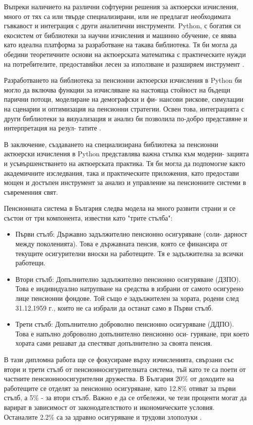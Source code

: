 \documentclass[a4paper,12pt]{article}
\begin{document}
Въпреки наличието на различни софтуерни решения за актюерски изчисления, много от тях са или твърде специализирани, или не предлагат необходимата гъвкавост и интеграция с други аналитични инструменти. Python, с богатия си екосистем от библиотеки за научни изчисления и машинно обучение, се явява като идеална платформа за разработване на такава библиотека. Тя би могла да обедини теоретичните основи на актюерската математика с практическите нужди на потребителите, предоставяйки лесен за използване и разширяем инструмент \cite{numpy2024, pandas2024}.

Разработването на библиотека за пенсионни актюерски изчисления в Python би могло да включва функции за изчисляване на настояща стойност на бъдещи парични потоци, моделиране на демографски и фи- нансови рискове, симулации на сценарии и оптимизация на пенсионни стратегии. Освен това, интеграцията с други библиотеки за визуализация и анализ би позволила по-добро представяне и интерпретация на резул- татите \cite{matplotlib2024, seaborn2024}.

В заключение, създаването на специализирана библиотека за пенсионни актюерски изчисления в Python представлява важна стъпка към модерни- зацията и усъвършенстването на актюерската практика. Тя би могла да подпомогне както академичните изследвания, така и практическите приложения, като предостави мощен и достъпен инструмент за анализ и управление на пенсионните системи в съвременния свят.

Пенсионната система в България следва модела на много развити страни и се състои
от три компонента, известни като "трите стълба":
\begin{itemize}
        \item Първи стълб: Държавно задължително пенсионно осигуряване (соли- дарност между поколенията). Това е държавната пенсия, която се финансира от текущите осигурителни вноски на работещите. Тя е задължителна за всички работещи.
        \item Втори стълб: Допълнително задължително пенсионно осигуряване (ДЗПО). Това е индивидуално натрупване на средства в избрани от самото осигурено лице пенсионни фондове. Той също е задължителен за хората, родени след 31.12.1959 г., които не са избрали да останат само в Първи стълб.
        \item Трети стълб: Допълнително доброволно пенсионно осигуряване (ДДПО). Това е напълно доброволно допълнително пенсионно оси- гуряване, при което хората сами решават да спестяват допълнително за своята пенсия.
\end{itemize}
В тази дипломна работа ще се фокусираме върху изчисленията, свързани със втори и трети стълб от пенсионносигурителната система, тъй като те са поети от частните пенсионноосигурителни дружества. В България 20\% от доходите на работещите се отделят за пенсионно осигуряване, като 12.8\% отиват за първи стълб, а 5\% - за втори стълб. Важно е да се отбележи, че тези проценти могат да варират в зависимост от законодателството и икономическите условия. Останалите 2.2\% са за здравно осигуряване и трудови злополуки \cite{ZDZPO_2004, ZDOO_2000}.
\end{document}
